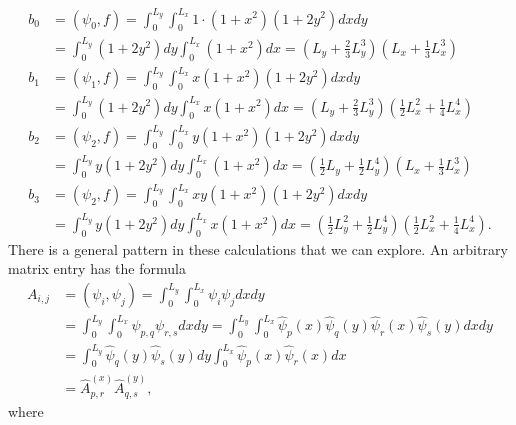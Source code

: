 \documentclass[../main.tex]{subfiles}
\begin{document}
$$
\begin{aligned}
	b_{0} &=\left(\psi_{0}, f\right)=\int_{0}^{L_{y}} \int_{0}^{L_{x}} 1 \cdot\left(1+x^{2}\right)\left(1+2 y^{2}\right) d x d y \\
	&=\int_{0}^{L_{y}}\left(1+2 y^{2}\right) d y \int_{0}^{L_{x}}\left(1+x^{2}\right) d x=\left(L_{y}+\frac{2}{3} L_{y}^{3}\right)\left(L_{x}+\frac{1}{3} L_{x}^{3}\right) \\
	b_{1} &=\left(\psi_{1}, f\right)=\int_{0}^{L_{y}} \int_{0}^{L_{x}} x\left(1+x^{2}\right)\left(1+2 y^{2}\right) d x d y \\
	&=\int_{0}^{L_{y}}\left(1+2 y^{2}\right) d y \int_{0}^{L_{x}} x\left(1+x^{2}\right) d x=\left(L_{y}+\frac{2}{3} L_{y}^{3}\right)\left(\frac{1}{2} L_{x}^{2}+\frac{1}{4} L_{x}^{4}\right) \\
	b_{2} &=\left(\psi_{2}, f\right)=\int_{0}^{L_{y}} \int_{0}^{L_{x}} y\left(1+x^{2}\right)\left(1+2 y^{2}\right) d x d y \\
	&=\int_{0}^{L_{y}} y\left(1+2 y^{2}\right) d y \int_{0}^{L_{x}}\left(1+x^{2}\right) d x=\left(\frac{1}{2} L_{y}+\frac{1}{2} L_{y}^{4}\right)\left(L_{x}+\frac{1}{3} L_{x}^{3}\right) \\
	b_{3} &=\left(\psi_{2}, f\right)=\int_{0}^{L_{y}} \int_{0}^{L_{x}} x y\left(1+x^{2}\right)\left(1+2 y^{2}\right) d x d y \\
	&=\int_{0}^{L_{y}} y\left(1+2 y^{2}\right) d y \int_{0}^{L_{x}} x\left(1+x^{2}\right) d x=\left(\frac{1}{2} L_{y}^{2}+\frac{1}{2} L_{y}^{4}\right)\left(\frac{1}{2} L_{x}^{2}+\frac{1}{4} L_{x}^{4}\right).
\end{aligned}
$$
There is a general pattern in these calculations that we can explore. An arbitrary matrix entry has the formula
$$
\begin{aligned}
	A_{i, j} &=\left(\psi_{i}, \psi_{j}\right)=\int_{0}^{L_{y}} \int_{0}^{L_{x}} \psi_{i} \psi_{j} d x d y \\
	&=\int_{0}^{L_{y}} \int_{0}^{L_{x}} \psi_{p, q} \psi_{r, s} d x d y=\int_{0}^{L_{y}} \int_{0}^{L_{x}} \hat{\psi}_{p}(x) \hat{\psi}_{q}(y) \hat{\psi}_{r}(x) \hat{\psi}_{s}(y) d x d y \\
	&=\int_{0}^{L_{y}} \hat{\psi}_{q}(y) \hat{\psi}_{s}(y) d y \int_{0}^{L_{x}} \hat{\psi}_{p}(x) \hat{\psi}_{r}(x) d x \\
	&=\hat{A}_{p, r}^{(x)} \hat{A}_{q, s}^{(y)},
\end{aligned}
$$
where
\end{document}
